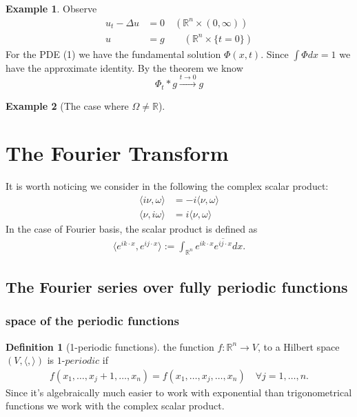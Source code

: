 \documentclass[a4paper,11pt,fleqn]{book}
\theoremstyle{definition}
\newtheorem{definition}{Definition}[section]
\newtheorem*{example}{Example}
\theoremstyle{remark}
\begin{document}
\begin{example}
Observe
\begin{align}
	u_t - \Delta u &= 0 \quad (\mathbb{R}^n \times (0, \infty)) \\
	u &= g \quad \quad (\mathbb{R}^n \times \{t = 0\})
\end{align}	
For the PDE (1) we have the fundamental solution $\Phi(x, t)$. Since $\int \Phi dx = 1$ we have the approximate identity. By the theorem we know
\begin{equation*}
	\Phi_t * g \overset{t \rightarrow 0}{\longrightarrow} g 
\end{equation*}
\end{example}

\begin{example}[The case where $\Omega \neq \mathbb{R}$]
\end{example}


\newpage
\section{The Fourier Transform}
It is worth noticing we consider in the following the complex scalar product:
\begin{align*}
	\langle i\nu, \omega \rangle &= - i\langle \nu, \omega \rangle \\
	\langle \nu, i \omega \rangle &= i \langle \nu, \omega \rangle 
\end{align*}
In the case of Fourier basis, the scalar product is defined as
\begin{align*}
	\langle e^{ik \cdot x}, e^{ij \cdot x} \rangle:=  \int_{\mathbb{R}^n} e^{ik\cdot x} \overline{e^{ij \cdot x}} dx. 
\end{align*}


\subsection{The Fourier series over fully periodic functions}

\subsubsection{space of the periodic functions}
\begin{definition}[1-periodic functions]
	the function $f:\mathbb{R}^n \rightarrow V$, to a Hilbert space $(V,\langle, \rangle)$ is $1$-$periodic$ if 
	\begin{align*}
		f(x_1, \dots, x_j + 1, \dots, x_n) = f(x_1, \dots, x_j, \dots, x_n) \quad \forall j = 1, \dots, n. 
	\end{align*}
Since it's algebraically much easier to work with exponential than trigonometrical functions we work with the complex scalar product. 
\end{definition}
\end{document}

